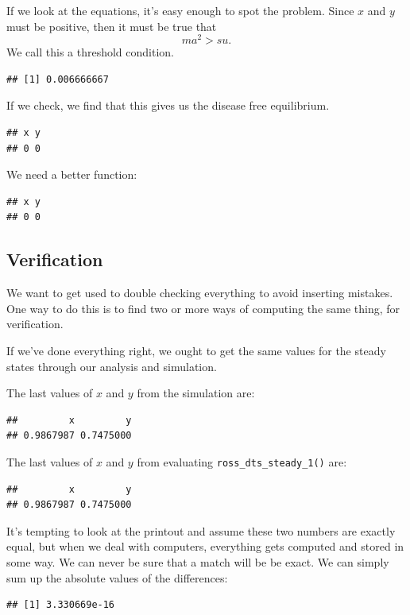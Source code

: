 \documentclass[
]{book}
\begin{document}
If we look at the equations, it's easy enough to spot the problem. Since \(x\) and \(y\) must be positive, then it must be true that \[m a^2 > su.\] We call this a threshold condition.

\begin{verbatim}
## [1] 0.006666667
\end{verbatim}

If we check, we find that this gives us the disease free equilibrium.

\begin{verbatim}
## x y 
## 0 0
\end{verbatim}

We need a better function:

\begin{verbatim}
## x y 
## 0 0
\end{verbatim}

\subsection{Verification}\label{verification}

We want to get used to double checking everything to avoid inserting mistakes. One way to do this is to find two or more ways of computing the same thing, for verification.

If we've done everything right, we ought to get the same values for the steady states through our analysis and simulation.

The last values of \(x\) and \(y\) from the simulation are:

\begin{verbatim}
##         x         y 
## 0.9867987 0.7475000
\end{verbatim}

The last values of \(x\) and \(y\) from evaluating \texttt{ross\_dts\_steady\_1()} are:

\begin{verbatim}
##         x         y 
## 0.9867987 0.7475000
\end{verbatim}

It's tempting to look at the printout and assume these two numbers are exactly equal, but when we deal with computers, everything gets computed and stored in some way. We can never be sure that a match will be be exact. We can simply sum up the absolute values of the differences:

\begin{verbatim}
## [1] 3.330669e-16
\end{verbatim}
\end{document}
